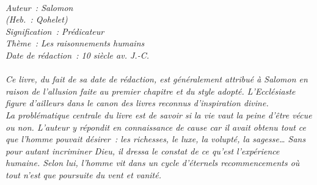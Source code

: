 \BFont
\noindent\hrulefill
{\footnotesize
\textit{
\bigskip
{\centering{}
\\Auteur~: Salomon
\\(Heb.~: Qohelet)
\\Signification~: Prédicateur
\\Thème~: Les raisonnements humains
\\Date de rédaction~: 10 siècle av. J.-C.\\}
}
\textit{
\\Ce livre, du fait de sa date de rédaction, est généralement attribué à Salomon en raison de l'allusion faite au premier chapitre et du style adopté. L'Ecclésiaste figure d'ailleurs dans le canon des livres reconnus d'inspiration divine.
\\La problématique centrale du livre est de savoir si la vie vaut la peine d'être vécue ou non. L'auteur y répondit en connaissance de cause car il avait obtenu tout ce que l'homme pouvait désirer~: les richesses, le luxe, la volupté, la sagesse… Sans pour autant incriminer Dieu, il dressa le constat de ce qu'est l'expérience humaine. Selon lui, l'homme vit dans un cycle d'éternels recommencements où tout n'est que poursuite du vent et vanité.\bigskip
}
}
\par\nobreak\noindent\hrulefill
